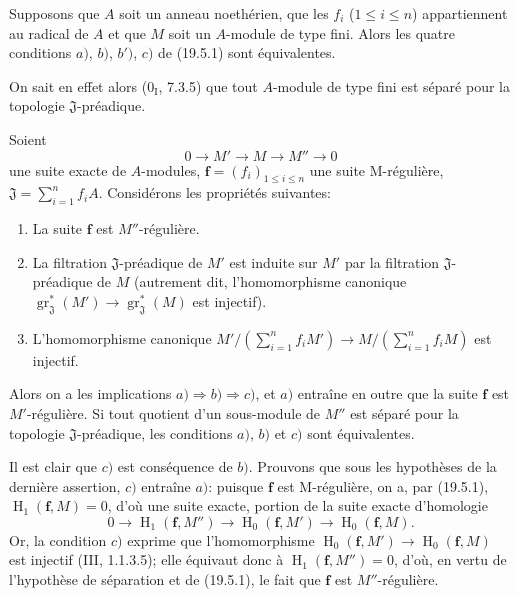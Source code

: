 \begin{corollary}[19.5.2]
\label{IV.19.5.2}
Supposons que $A$ soit un anneau noethérien, que les $f_i$ ($1\leq i\leq n$) appartiennent au radical de $A$ et que $M$ soit un $A$-module de type fini. Alors les quatre conditions $a)$, $b)$, $b')$, $c)$ de (19.5.1) sont équivalentes.
\end{corollary}

On sait en effet alors ($0_{\mathrm I}$, 7.3.5) que tout $A$-module de type fini est séparé pour la topologie $\mathfrak J$-préadique.

\begin{proposition}[19.5.3]
\label{IV.19.5.3}
Soient
\[
  0\longrightarrow M'\longrightarrow M\longrightarrow M''\longrightarrow0
\]
une suite exacte de $A$-modules, $\mathbf f=(f_i)_{1\leq i\leq n}$ une suite M-régulière, $\mathfrak J=\sum_{i=1}^n f_iA$. Considérons les propriétés suivantes:
\begin{enumerate}
  \item[a)] La suite $\mathbf f$ est $M''$-régulière.
  \item[b)] La filtration $\mathfrak J$-préadique de $M'$ est induite sur $M'$ par la filtration $\mathfrak J$-préadique de $M$ (autrement dit, l'homomorphisme canonique $\operatorname{gr}_{\mathfrak J}^*(M')\to\operatorname{gr}_{\mathfrak J}^*(M)$ est injectif).
  \item[c)] L'homomorphisme canonique $M'/(\sum_{i=1}^n f_iM')\to M/(\sum_{i=1}^n f_iM)$ est injectif.
\end{enumerate}
Alors on a les implications $a)\Rightarrow b)\Rightarrow c)$, et $a)$ entraîne en outre que la suite $\mathbf f$ est $M'$-régulière. Si tout quotient d'un sous-module de $M''$ est séparé pour la topologie $\mathfrak J$-préadique, les conditions $a)$, $b)$ et $c)$ sont équivalentes.
\end{proposition}

Il est clair que $c)$ est conséquence de $b)$. Prouvons que sous les hypothèses de la dernière assertion, $c)$ entraîne $a)$: puisque $\mathbf f$ est M-régulière, on a, par (19.5.1), $\operatorname{H}_1(\mathbf f,M)=0$, d'où une suite exacte, portion de la suite exacte d'homologie
\[
  0\longrightarrow\operatorname{H}_1(\mathbf f,M'')\longrightarrow\operatorname{H}_0(\mathbf f,M')\longrightarrow\operatorname{H}_0(\mathbf f,M).
\]
Or, la condition $c)$ exprime que l'homomorphisme $\operatorname{H}_0(\mathbf f,M')\to\operatorname{H}_0(\mathbf f,M)$ est injectif (III, 1.1.3.5); elle équivaut donc à $\operatorname{H}_1(\mathbf f,M'')=0$, d'où, en vertu de l'hypothèse de séparation et de (19.5.1), le fait que $\mathbf f$ est $M''$-régulière.

